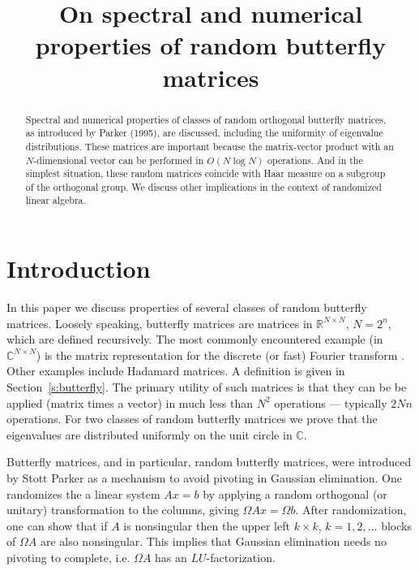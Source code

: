 \title{On spectral and numerical properties of random butterfly matrices}

\begin{abstract}
Spectral and numerical properties of classes of random orthogonal butterfly matrices, as introduced by Parker (1995), are discussed, including the uniformity of eigenvalue distributions. These matrices are important because the matrix-vector product with an $N$-dimensional vector can be performed in $O(N \log N)$ operations. And in the simplest situation, these random matrices coincide with Haar measure on a subgroup of the orthogonal group.  We discuss other implications in the context of randomized linear algebra.
\end{abstract}

\section{Introduction}

In this paper we discuss properties of several classes of random butterfly matrices.  Loosely speaking, butterfly matrices are matrices in $\mathbb R^{N\times N}$, $N = 2^n$, which are defined recursively.  The most commonly encountered example (in $\mathbb C^{N\times N}$) is the matrix representation for the discrete (or fast) Fourier transform \cite{VanLoan1992}.  Other examples include Hadamard matrices.  A definition is given in Section~\ref{s:butterfly}.  The primary utility of such matrices is that they can be be applied (matrix times a vector) in much less than $N^2$ operations --- typically $2 N n$ operations.  For two classes of random butterfly matrices we prove that the eigenvalues are distributed uniformly on the unit circle in $\mathbb C$.

Butterfly matrices, and in particular, random butterfly matrices, were introduced by Stott Parker \cite{Parker1995} as a mechanism to avoid pivoting in Gaussian elimination.  One randomizes the a linear system $Ax = b$ by applying a random orthogonal (or unitary) transformation to the columns, giving $\Omega Ax = \Omega b$.  After randomization, one can show that if $A$ is nonsingular then the upper left $k \times k$, $k = 1,2,\ldots$  blocks of $\Omega A$ are also nonsingular.  This implies that Gaussian elimination needs no pivoting to complete, i.e. $\Omega A$ has an $LU$-factorization.

